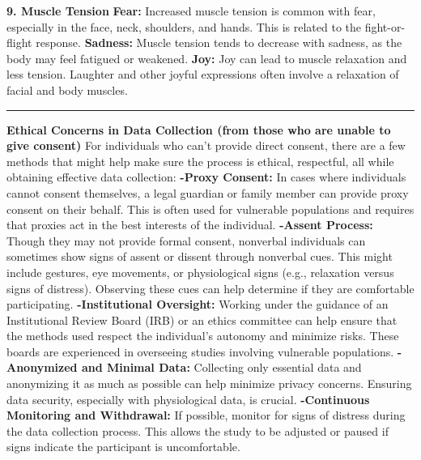 \documentclass[12pt, research paper]{report}
\begin{document}
	\noindent \textbf{9. Muscle Tension}
	\newline \textbf{Fear:} Increased muscle tension is common with fear, especially in the face, neck, shoulders, and hands. This is related to the fight-or-flight response.
	\newline \textbf{Sadness:} Muscle tension tends to decrease with sadness, as the body may feel fatigued or weakened.
	\newline \textbf{Joy:} Joy can lead to muscle relaxation and less tension. Laughter and other joyful expressions often involve a relaxation of facial and body muscles.
	\rule{13.85cm}{0.01cm}
	
	\noindent \textbf{Ethical Concerns in Data Collection (from those who are unable to give consent)}
	\newline For individuals who can't provide direct consent, there are a few methods that might help make sure the process is ethical, respectful, all while obtaining effective data collection:
	\newline \textbf{-Proxy Consent:} In cases where individuals cannot consent themselves, a legal guardian or family member can provide proxy consent on their behalf. This is often used for vulnerable populations and requires that proxies act in the best interests of the individual.
	\newline \textbf{-Assent Process:} Though they may not provide formal consent, nonverbal individuals can sometimes show signs of assent or dissent through nonverbal cues. This might include gestures, eye movements, or physiological signs (e.g., relaxation versus signs of distress). Observing these cues can help determine if they are comfortable participating.
	\newline \textbf{-Institutional Oversight:} Working under the guidance of an Institutional Review Board (IRB) or an ethics committee can help ensure that the methods used respect the individual’s autonomy and minimize risks. These boards are experienced in overseeing studies involving vulnerable populations.
	\newline \textbf{-Anonymized and Minimal Data:} Collecting only essential data and anonymizing it as much as possible can help minimize privacy concerns. Ensuring data security, especially with physiological data, is crucial. 
	\newline \textbf{-Continuous Monitoring and Withdrawal:} If possible, monitor for signs of distress during the data collection process. This allows the study to be adjusted or paused if signs indicate the participant is uncomfortable.
	\linebreak
	
\end{document}
